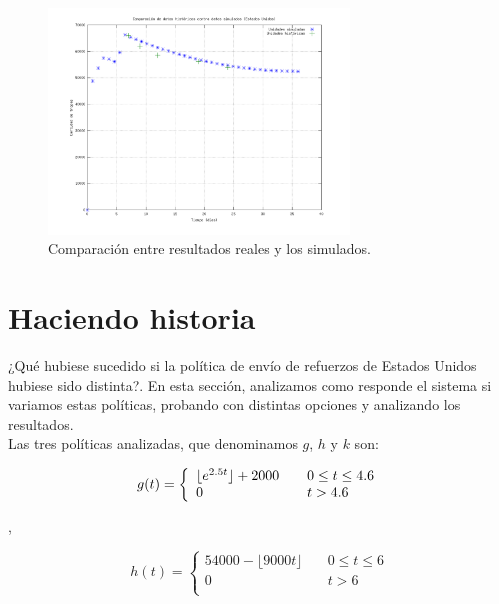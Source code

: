 \documentclass{sig-alternate}
\begin{document}
\begin{figure}[h]
\begin{center}
\includegraphics[width=8cm]{real_vs_sim.png}
\caption{\label{fig:realvssim}Comparación entre resultados reales y los simulados.}
\end{center}
\end{figure}

\newpage

\section{Haciendo historia}

¿Qué hubiese sucedido si la política de envío de refuerzos de Estados Unidos hubiese sido distinta?. En esta sección, analizamos como 
responde el sistema si variamos estas políticas, probando con distintas opciones y analizando los resultados.\\
Las tres políticas analizadas, que denominamos $g$, $h$ y $k$  son:

\begin{equation}
g(t) = \left\{ 
    \begin{array}{l l}
    \lfloor e^{2.5t} \rfloor + 2000 & \quad 0 \leq t \leq 4.6 \\
    0 & \quad t > 4.6\\
    \end{array} \right.
    \end{equation}

,

\begin{equation}
h(t) = \left\{ 
    \begin{array}{ll}
    54000 - \lfloor 9000t \rfloor & \quad 0 \leq t \leq 6 \\
    0 & \quad t > 6\\
    \end{array} \right.
\end{equation}
\end{document}
